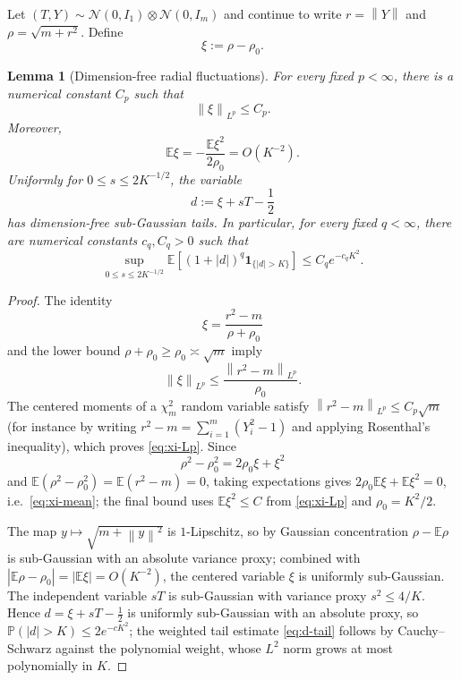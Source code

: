 \documentclass[11pt]{article}
\theoremstyle{plain}
\newtheorem{lemma}[theorem]{Lemma}
\theoremstyle{definition}
\theoremstyle{remark}
\newcommand{\E}{\mathbb{E}}
\newcommand{\Prob}{\mathbb{P}}
\newcommand{\N}{\mathcal{N}}
\newcommand{\Id}{I}
\newcommand{\1}{\mathbf{1}}
\newcommand{\norm}[1]{\left\lVert #1\right\rVert}
\newcommand{\abs}[1]{\left\lvert #1\right\rvert}
\begin{document}
Let $(T,Y)\sim\N(0,\Id_1)\otimes\N(0,\Id_m)$ and continue to write
$r=\norm Y$ and $\rho=\sqrt{m+r^2}$. Define
\[
    \xi:=\rho-\rho_0.
\]

\begin{lemma}[Dimension-free radial fluctuations]
\label{lem:xi}
For every fixed $p<\infty$, there is a numerical constant $C_p$ such that
\begin{equation}
    \norm{\xi}_{L^p}\leq C_p.
    \label{eq:xi-Lp}
\end{equation}
Moreover,
\begin{equation}
    \E\xi
    =
    -\frac{\E\xi^2}{2\rho_0}
    =
    O(K^{-2}).
    \label{eq:xi-mean}
\end{equation}
Uniformly for $0\leq s\leq2K^{-1/2}$, the variable
\[
    d:=\xi+sT-\frac12
\]
has dimension-free sub-Gaussian tails. In particular, for every fixed
$q<\infty$, there are numerical constants $c_q,C_q>0$ such that
\begin{equation}
    \sup_{0\leq s\leq2K^{-1/2}}
    \E\!\left[
        (1+\abs d)^q\1_{\{\abs d>K\}}
    \right]
    \leq
    C_qe^{-c_qK^2}.
    \label{eq:d-tail}
\end{equation}
\end{lemma}

\begin{proof}
The identity
\[
    \xi
    =
    \frac{r^2-m}{\rho+\rho_0}
\]
and the lower bound $\rho+\rho_0\geq\rho_0\asymp\sqrt m$ imply
\[
    \norm\xi_{L^p}
    \leq
    \frac{\norm{r^2-m}_{L^p}}{\rho_0}.
\]
The centered moments of a $\chi_m^2$ random variable satisfy
$\norm{r^2-m}_{L^p}\leq C_p\sqrt m$ (for instance by writing
$r^2-m=\sum_{i=1}^m(Y_i^2-1)$ and applying Rosenthal's inequality), which
proves \eqref{eq:xi-Lp}. Since
\[
    \rho^2-\rho_0^2
    =
    2\rho_0\xi+\xi^2
\]
and $\E(\rho^2-\rho_0^2)=\E(r^2-m)=0$, taking expectations gives
$2\rho_0\E\xi+\E\xi^2=0$, i.e.\ \eqref{eq:xi-mean}; the final bound uses
$\E\xi^2\leq C$ from \eqref{eq:xi-Lp} and $\rho_0=K^2/2$.

The map $y\mapsto\sqrt{m+\norm y^2}$ is $1$-Lipschitz, so by Gaussian
concentration $\rho-\E\rho$ is sub-Gaussian with an absolute variance proxy;
combined with $\abs{\E\rho-\rho_0}=\abs{\E\xi}=O(K^{-2})$, the centered
variable $\xi$ is uniformly sub-Gaussian. The independent variable $sT$ is
sub-Gaussian with variance proxy $s^2\leq4/K$. Hence $d=\xi+sT-\tfrac12$ is
uniformly sub-Gaussian with an absolute proxy, so
$\Prob(\abs d>K)\leq2e^{-c K^2}$; the weighted tail estimate
\eqref{eq:d-tail} follows by Cauchy--Schwarz against the polynomial weight,
whose $L^2$ norm grows at most polynomially in $K$.
\end{proof}
\end{document}
